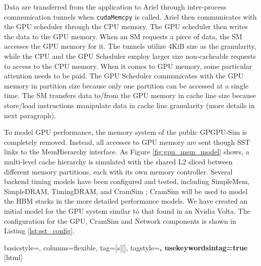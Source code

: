 Data are transferred from the application to Ariel through
inter-process communication tunnels when \texttt{cudaMemcpy} is called. 
Ariel then communicates with the GPU scheduler through
the CPU memory. The GPU scheduler then writes the data to the GPU memory. When an SM
requests a piece of data, the SM accesses the GPU memory for it.
The tunnels utilize 4KiB size as the granularity, while the CPU and the GPU Scheduler
employ larger size non-cacheable requests to access to the CPU memory. When it comes to
GPU memory, some particular attention needs to be paid. The GPU Scheduler communicates with 
the GPU memory in partition size because only one partition can be accessed at a single time. 
The SM transfers data to/from the GPU memory in cache line size because store/load 
instructions manipulate data in cache line granularity (more details in next paragraph). 

To model GPU performance, the memory system of the public GPGPU-Sim is
completely removed. Instead, all accesses to GPU memory are sent though SST
links to the MemHierarchy interface. As Figure \ref{fig:gpu_mem_model} shows, a
multi-level cache hierarchy is simulated with the shared L2 sliced between
different memory partitions, each with its own memory controller. Several
backend timing models have been configured and tested, including SimpleMem,
SimpleDRAM, TimingDRAM, and CramSim \cite{healy2017}; CramSim will be used to
model the HBM stacks in the more detailed performance models. We have created an
initial model for the GPU system similar to that found in an Nvidia Volta. The
configuration for the GPU, CramSim and Network components is shown in Listing
\ref{lst:sst_config}.


{
  basicstyle={\small\ttfamily},
  columns=flexible,
  tag=[s]{[]},
  tagstyle=\color{dkgreen}\bfseries,
  usekeywordsintag=true
}[html]




